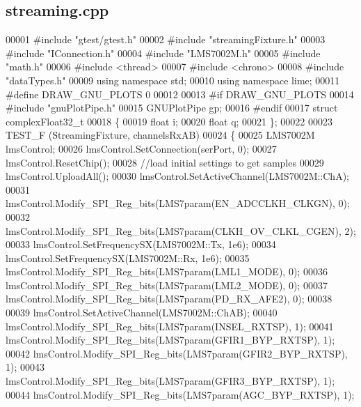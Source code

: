 \subsection{streaming.\+cpp}
\label{streaming_8cpp_source}

\begin{DoxyCode}
00001 \textcolor{preprocessor}{#include "gtest/gtest.h"}
00002 \textcolor{preprocessor}{#include "streamingFixture.h"}
00003 \textcolor{preprocessor}{#include "IConnection.h"}
00004 \textcolor{preprocessor}{#include "LMS7002M.h"}
00005 \textcolor{preprocessor}{#include "math.h"}
00006 \textcolor{preprocessor}{#include <thread>}
00007 \textcolor{preprocessor}{#include <chrono>}
00008 \textcolor{preprocessor}{#include "dataTypes.h"}
00009 \textcolor{keyword}{using namespace }std;
00010 \textcolor{keyword}{using namespace }lime;
00011 \textcolor{preprocessor}{#define DRAW\_GNU\_PLOTS 0}
00012 
00013 \textcolor{preprocessor}{#if DRAW\_GNU\_PLOTS}
00014 \textcolor{preprocessor}{#include "gnuPlotPipe.h"}
00015 GNUPlotPipe gp;
00016 \textcolor{preprocessor}{#endif}
00017 \textcolor{keyword}{struct }complexFloat32_t
00018 \{
00019     \textcolor{keywordtype}{float} i;
00020     \textcolor{keywordtype}{float} q;
00021 \};
00022 
00023 TEST_F (StreamingFixture, channelsRxAB)
00024 \{
00025     LMS7002M lmsControl;
00026     lmsControl.SetConnection(serPort, 0);
00027     lmsControl.ResetChip();
00028     \textcolor{comment}{//load initial settings to get samples}
00029     lmsControl.UploadAll();
00030     lmsControl.SetActiveChannel(LMS7002M::ChA);
00031     lmsControl.Modify_SPI_Reg_bits(LMS7param(EN_ADCCLKH_CLKGN), 0);
00032     lmsControl.Modify_SPI_Reg_bits(LMS7param(CLKH_OV_CLKL_CGEN), 2);
00033     lmsControl.SetFrequencySX(LMS7002M::Tx, 1e6);
00034     lmsControl.SetFrequencySX(LMS7002M::Rx, 1e6);
00035     lmsControl.Modify_SPI_Reg_bits(LMS7param(LML1_MODE), 0);
00036     lmsControl.Modify_SPI_Reg_bits(LMS7param(LML2_MODE), 0);
00037     lmsControl.Modify_SPI_Reg_bits(LMS7param(PD_RX_AFE2), 0);
00038 
00039     lmsControl.SetActiveChannel(LMS7002M::ChAB);
00040     lmsControl.Modify_SPI_Reg_bits(LMS7param(INSEL_RXTSP), 1);
00041     lmsControl.Modify_SPI_Reg_bits(LMS7param(GFIR1_BYP_RXTSP), 1);
00042     lmsControl.Modify_SPI_Reg_bits(LMS7param(GFIR2_BYP_RXTSP), 1);
00043     lmsControl.Modify_SPI_Reg_bits(LMS7param(GFIR3_BYP_RXTSP), 1);
00044     lmsControl.Modify_SPI_Reg_bits(LMS7param(AGC_BYP_RXTSP), 1);

\end{DoxyCode}
